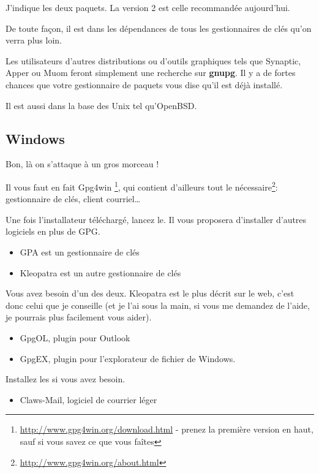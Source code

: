 J'indique les deux paquets. La version 2 est celle recommandée
aujourd'hui.

De toute façon, il est dans les dépendances de tous les gestionnaires de
clés qu'on verra plus loin.

Les utilisateurs d'autres distributions ou d'outils graphiques tels que
Synaptic, Apper ou Muom feront simplement une recherche sur
\textbf{gnupg}. Il y a de fortes chances que votre gestionnaire de
paquets vous dise qu'il est déjà installé.

Il est aussi dans la base des Unix tel qu'OpenBSD.

\subsection{Windows}\label{windows}

Bon, là on s'attaque à un gros morceau !

Il vous faut en fait Gpg4win \footnote{\url{http://www.gpg4win.org/download.html} - prenez la première version en haut, sauf si vous savez ce que vous
faîtes}, qui contient d'ailleurs tout le nécessaire\footnote{\url{http://www.gpg4win.org/about.html}}: gestionnaire de clés, client
courriel\ldots{}

Une fois l'installateur téléchargé, lancez le. Il vous proposera d'installer d'autres logiciels en plus de GPG.

\begin{itemize}
\itemsep1pt\parskip0pt
\item
  GPA est un gestionnaire de clés
\item
  Kleopatra est un autre gestionnaire de clés
\end{itemize}

Vous avez besoin d'un des deux. Kleopatra est le plus décrit sur le web,
c'est donc celui que je conseille (et je l'ai sous la main, si vous me
demandez de l'aide, je pourrais plus facilement vous aider).

\begin{itemize}
\itemsep1pt\parskip0pt
\item
  GpgOL, plugin pour Outlook
\item
  GpgEX, plugin pour l'explorateur de fichier de Windows.
\end{itemize}

Installez les si vous avez besoin.

\begin{itemize}
\itemsep1pt\parskip0pt
\item
  Claws-Mail, logiciel de courrier léger
\end{itemize}

